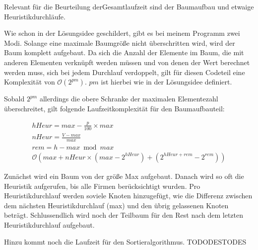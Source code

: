 Relevant für die Beurteilung derGesamtlaufzeit sind der Baumaufbau und etwaige Heuristikdurchläufe.

Wie schon in der Lösungsidee geschildert, gibt es bei meinem Programm zwei Modi. Solange eine maximale Baumgröße nicht überschritten wird, wird der Baum komplett aufgebaut.
Da sich die Anzahl der Elemente im Baum, die mit anderen Elementen verknüpft werden müssen und von denen der Wert berechnet werden muss, sich bei jedem Durchlauf verdoppelt, gilt für diesen Codeteil eine Komplexität von \(\mathcal{O}(2^{pm})\). \(pm\) ist hierbei wie in der Lösungsidee definiert. 

Sobald \(2^{pm}\) allerdings die obere Schranke der maximalen Elementezahl überschreitet, gilt folgende Laufzeitkomplexität für den Baumaufbauteil:

\begin{gather}
	{hHeur} = max - \frac{p}{100} \times max \\
	{nHeur} = \frac{V-max}{max} \\
	{rem}   = h-max \bmod max \\
	\mathcal{O}(max+nHeur\times{}(max-2^{hHeur})+(2^{hHeur + rem}-2^{rem}))
\end{gather}

Zunächst wird ein Baum von der größe Max aufgebaut. Danach wird so oft die Heuristik aufgerufen, bis alle Firmen berücksichtigt wurden. Pro Heuristikdurchlauf werden soviele Knoten hinzugefügt, wie die Differenz zwischen dem nächsten Heuristikdurchlauf (max) und den übrig gelassenen Knoten beträgt. Schlussendlich wird noch der Teilbaum für den Rest nach dem letzten Heuristikdurchlauf aufgebaut.

Hinzu kommt noch die Laufzeit für den Sortieralgorithmus. TODODESTODES